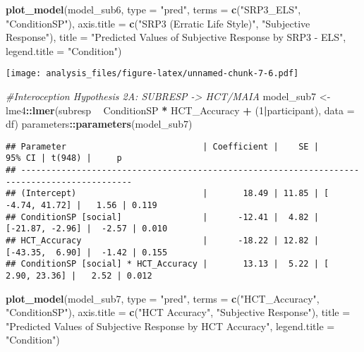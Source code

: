 \documentclass[
]{article}
\newenvironment{Shaded}{\begin{snugshade}}{\end{snugshade}}
\newcommand{\CommentTok}[1]{\textcolor[rgb]{0.56,0.35,0.01}{\textit{#1}}}
\newcommand{\DataTypeTok}[1]{\textcolor[rgb]{0.13,0.29,0.53}{#1}}
\newcommand{\DecValTok}[1]{\textcolor[rgb]{0.00,0.00,0.81}{#1}}
\newcommand{\KeywordTok}[1]{\textcolor[rgb]{0.13,0.29,0.53}{\textbf{#1}}}
\newcommand{\NormalTok}[1]{#1}
\newcommand{\OperatorTok}[1]{\textcolor[rgb]{0.81,0.36,0.00}{\textbf{#1}}}
\newcommand{\StringTok}[1]{\textcolor[rgb]{0.31,0.60,0.02}{#1}}
\begin{document}
\begin{Shaded}
\begin{Highlighting}[]
\KeywordTok{plot_model}\NormalTok{(model_sub6, }\DataTypeTok{type =} \StringTok{"pred"}\NormalTok{, }\DataTypeTok{terms =} \KeywordTok{c}\NormalTok{(}\StringTok{"SRP3_ELS"}\NormalTok{, }\StringTok{"ConditionSP"}\NormalTok{), }\DataTypeTok{axis.title =} \KeywordTok{c}\NormalTok{(}\StringTok{"SRP3 (Erratic Life Style)"}\NormalTok{, }\StringTok{"Subjective Response"}\NormalTok{), }\DataTypeTok{title =} \StringTok{"Predicted Values of Subjective Response by SRP3 - ELS"}\NormalTok{, }\DataTypeTok{legend.title =} \StringTok{"Condition"}\NormalTok{)}
\end{Highlighting}
\end{Shaded}

\texttt{[image: analysis\_files/figure-latex/unnamed-chunk-7-6.pdf]}

\begin{Shaded}
\begin{Highlighting}[]
\CommentTok{#Interoception Hypothesis 2A: SUBRESP -> HCT/MAIA}
\NormalTok{model_sub7 <-}\StringTok{ }\NormalTok{lme4}\OperatorTok{::}\KeywordTok{lmer}\NormalTok{(subresp }\OperatorTok{~}\StringTok{ }\NormalTok{ConditionSP }\OperatorTok{*}\StringTok{ }\NormalTok{HCT_Accuracy }\OperatorTok{+}\StringTok{ }\NormalTok{(}\DecValTok{1}\OperatorTok{|}\NormalTok{participant), }\DataTypeTok{data =}\NormalTok{ df)}
\NormalTok{parameters}\OperatorTok{::}\KeywordTok{parameters}\NormalTok{(model_sub7)}
\end{Highlighting}
\end{Shaded}

\begin{verbatim}
## Parameter                           | Coefficient |    SE |          95% CI | t(948) |     p
## --------------------------------------------------------------------------------------------
## (Intercept)                         |       18.49 | 11.85 | [ -4.74, 41.72] |   1.56 | 0.119
## ConditionSP [social]                |      -12.41 |  4.82 | [-21.87, -2.96] |  -2.57 | 0.010
## HCT_Accuracy                        |      -18.22 | 12.82 | [-43.35,  6.90] |  -1.42 | 0.155
## ConditionSP [social] * HCT_Accuracy |       13.13 |  5.22 | [  2.90, 23.36] |   2.52 | 0.012
\end{verbatim}

\begin{Shaded}
\begin{Highlighting}[]
\KeywordTok{plot_model}\NormalTok{(model_sub7, }\DataTypeTok{type =} \StringTok{"pred"}\NormalTok{, }\DataTypeTok{terms =} \KeywordTok{c}\NormalTok{(}\StringTok{"HCT_Accuracy"}\NormalTok{, }\StringTok{"ConditionSP"}\NormalTok{), }\DataTypeTok{axis.title =} \KeywordTok{c}\NormalTok{(}\StringTok{"HCT Accuracy"}\NormalTok{, }\StringTok{"Subjective Response"}\NormalTok{), }\DataTypeTok{title =} \StringTok{"Predicted Values of Subjective Response by HCT Accuracy"}\NormalTok{, }\DataTypeTok{legend.title =} \StringTok{"Condition"}\NormalTok{)}
\end{Highlighting}
\end{Shaded}
\end{document}
